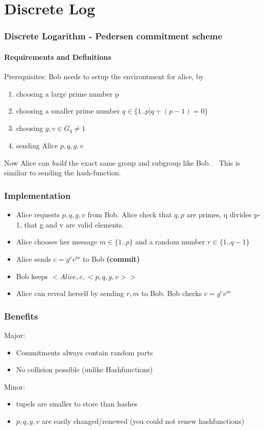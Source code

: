 \section{Discrete Log}
\begin{frame}
	\frametitle{Discrete Logarithm - Pedersen commitment scheme}
	\framesubtitle{Requirements and Definitions}
	Prerequisites: Bob needs to setup the environtment for alice, by 
	\begin{enumerate}
		\item choosing a large prime number p
		\item choosing a smaller prime number $q \in \{1..p| q\div (p-1) = 0\}$
		\item choosing $g,v \in G_q \neq 1$
		\item sending Alice $p,q,g,v$ 
	\end{enumerate}

	Now Alice can \textit{build} the exact same group and subgroup like Bob. ~\newline
	This is similiar to sending the hash-function.  
\end{frame}

\begin{frame}
	\frametitle{Implementation}
	\begin{itemize}
		\item Alice requests $p,q,g,v$ from Bob. Alice check that $q,p$ are primes, q divides p-1, that g and v are valid elements. 
		\item Alice chooses her message $m \in \{1..p\}$ and a random number $r \in \{1..q-1\}$
		\item Alice sends $c = g^rv^m$ to Bob \textbf{(commit)}
		\item Bob keeps $<Alice,c,<p,q,g,v>>$
		\item Alice can reveal herself by sending $r,m$ to Bob. Bob checks $c = g^rv^m$
	\end{itemize}
\end{frame}

\begin{frame}
	\frametitle{Benefits}
	Major:
	\begin{itemize}
		\item Commitments always contain random parts
		\item No collision possible (unlike Hashfunctions)	
	\end{itemize}
	Minor:
	\begin{itemize}
		\item tupels are smaller to store than hashes
		\item $p,q,g,v$ are easily changed/renewed (you could not renew hashfunctions)
	\end{itemize}
\end{frame}